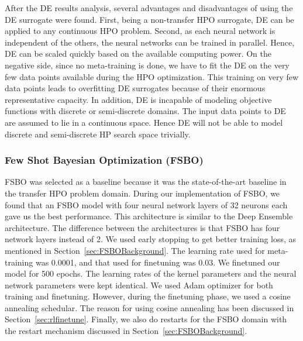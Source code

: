 \documentclass[12pt, twoside, ngerman]{report}
\begin{document}
After the DE results analysis, several advantages and disadvantages of using the DE surrogate were found.
First, being a non-transfer HPO surrogate, DE can be applied to any continuous HPO problem.
Second,  as each neural network is independent of the others,  the neural networks can be trained in parallel.
Hence, DE can be scaled quickly based on the available computing power.
On the negative side,  since no meta-training is done, we have to fit the DE on the very few data points available during the HPO optimization.
This training on very few data points leads to overfitting DE surrogates because of their enormous representative capacity.
In addition, DE is incapable of modeling objective functions with discrete or semi-discrete domains.
The input data points to DE are assumed to lie in a continuous space.
Hence DE will not be able to model discrete and semi-discrete HP search space trivially.


\subsubsection{Few Shot Bayesian Optimization (FSBO)}

FSBO was selected as a baseline because it was the state-of-the-art baseline in the transfer HPO problem domain.
During our implementation of FSBO, we found that an FSBO model with four neural network layers of 32 neurons each gave us the best performance.
This architecture is similar to the Deep Ensemble architecture.
The difference between the architectures is that FSBO has four network layers instead of 2.
We used early stopping to get better training loss, as mentioned in Section~\ref{sec:FSBOBackground}.
The learning rate used for meta-training was 0.0001, and that used for finetuning was 0.03.
We finetuned our model for 500 epochs.
The learning rates of the kernel parameters and the neural network parameters were kept identical.
We used Adam optimizer for both training and finetuning.
However, during the finetuning phase, we used a cosine annealing schedular. The reason for using cosine annealing has been discussed in Section~\ref{sec:rlfinetune}.
Finally, we also do restarts for the FSBO domain with the restart mechanism discussed in Section~\ref{sec:FSBOBackground}.
\end{document}
